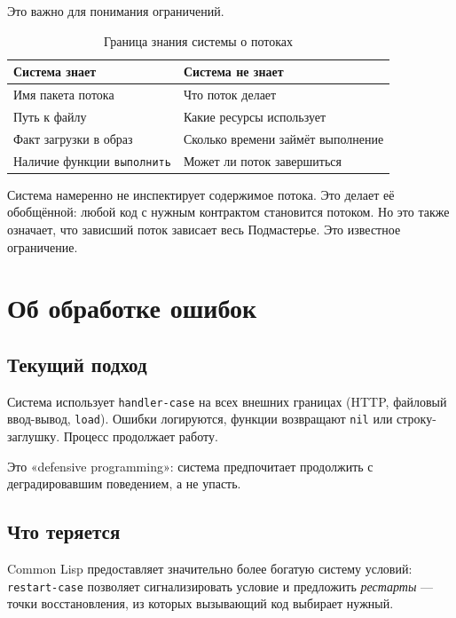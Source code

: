 \documentclass[11pt,a4paper]{article}
\begin{document}
Это важно для понимания ограничений.

\begin{table}[H]\centering\small
\begin{tabular}{p{5cm}p{5cm}}
\toprule
\textbf{Система знает} & \textbf{Система не знает} \\
\midrule
Имя пакета потока & Что поток делает \\
Путь к файлу & Какие ресурсы использует \\
Факт загрузки в образ & Сколько времени займёт выполнение \\
Наличие функции \texttt{выполнить} & Может ли поток завершиться \\
\bottomrule
\end{tabular}
\caption{Граница знания системы о потоках}
\end{table}

Система намеренно не инспектирует содержимое потока. Это делает её обобщённой: любой код с нужным контрактом становится потоком. Но это также означает, что зависший поток зависает весь Подмастерье. Это известное ограничение.

\section{Об обработке ошибок}

\subsection{Текущий подход}

Система использует \texttt{handler-case} на всех внешних границах (HTTP, файловый ввод-вывод, \texttt{load}). Ошибки логируются, функции возвращают \texttt{nil} или строку-заглушку. Процесс продолжает работу.

Это «defensive programming»: система предпочитает продолжить с деградировавшим поведением, а не упасть.

\subsection{Что теряется}

Common Lisp предоставляет значительно более богатую систему условий: \texttt{restart-case} позволяет сигнализировать условие и предложить \textit{рестарты} — точки восстановления, из которых вызывающий код выбирает нужный.
\end{document}

